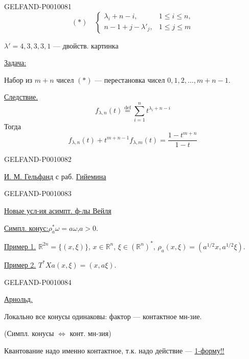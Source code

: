 \begin{GelfandAdjacentEvidence}{GELFAND-P001008}{1}
\[
(*)\quad\left\{
\begin{array}{ll}
\lambda_i+n-i,&1\leq i\leq n,\\
n-1+j-\lambda'_j,&1\leq j\leq m
\end{array}\right.
\]

$\lambda'=4,3,3,3,1$ --- двойств. картинка

\underline{Задача:}

Набор из $m+n$ чисел $(*)$ --- перестановка чисел $0,1,2,\ldots,m+n-1$.

\underline{Следствие.}
\[
f_{\lambda,n}(t)\overset{\mathrm{def}}{=}\sum_{i=1}^{n}t^{\lambda_i+n-i}
\]
Тогда
\[
f_{\lambda,n}(t)+t^{m+n-1}f_{\lambda,m}(t)=\frac{1-t^{m+n}}{1-t}
\]
\end{GelfandAdjacentEvidence}
\begin{GelfandAdjacentEvidence}{GELFAND-P001008}{2}


\underline{И. М. Гельфанд} с раб. \underline{Гийемина}
\end{GelfandAdjacentEvidence}
\begin{GelfandAdjacentEvidence}{GELFAND-P001008}{3}


\underline{Новые усл-ия асимпт. ф-лы Вейля}

\underline{Симпл. конус:}\qquad $\rho_a^*\omega=a\omega$,\quad $a>0$.

\underline{Пример 1.} $\mathbb R^{2n}=\{(x,\xi)\}$,
$x\in\mathbb R^n$, $\xi\in(\mathbb R^n)^*$,
$\rho_a(x,\xi)=(a^{1/2}x,a^{1/2}\xi)$.

\underline{Пример 2.} $T^*X$\qquad $a(x,\xi)=(x,a\xi)$.
\end{GelfandAdjacentEvidence}
\begin{GelfandAdjacentEvidence}{GELFAND-P001008}{4}


\underline{Арнольд.}

Локально все конусы одинаковы: фактор --- контактное мн-зие.

(Симпл. конусы $\Longleftrightarrow$ конт. мн-зия)

Квантование надо именно контактное, т.к. надо действие --- \underline{1-форму!!}
\end{GelfandAdjacentEvidence}
